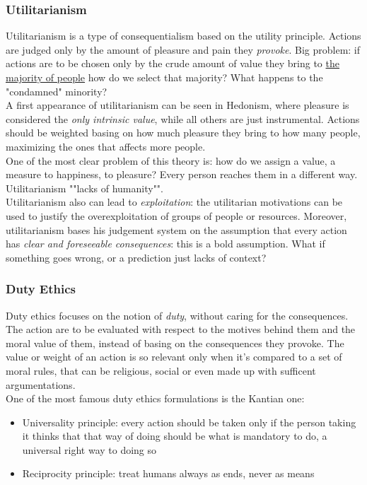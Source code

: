 \documentclass{article}
\begin{document}
			\subsubsection{Utilitarianism}
				Utilitarianism is a type of consequentialism based on the utility principle. Actions are judged only by the amount of pleasure and pain they \textit{provoke}. Big problem: if actions are to be chosen only by the crude amount of value they bring to \underline{the majority of people} how do we select that majority? What happens to the "condamned" minority?\\
				A first appearance of utilitarianism can be seen in Hedonism, where pleasure is considered the \textit{only intrinsic value}, while all others are just instrumental. Actions should be weighted basing on how much pleasure they bring to how many people, maximizing the ones that affects more people.\\
				One of the most clear problem of this theory is: how do we assign a value, a measure to happiness, to pleasure? Every person reaches them in a different way. Utilitarianism ""lacks of humanity"".\\
				Utilitarianism also can lead to \textit{exploitation}: the utilitarian motivations can be used to justify the overexploitation of groups of people or resources. Moreover, utilitarianism bases his judgement system on the assumption that every action has \textit{clear and foreseeable consequences}: this is a bold assumption. What if something goes wrong, or a prediction just lacks of context?

			\subsubsection{Duty Ethics}
				Duty ethics focuses on the notion of \textit{duty}, without caring for the consequences. The action are to be evaluated with respect to the motives behind them and the moral value of them, instead of basing on the consequences they provoke. The value or weight of an action is so relevant only when it's compared to a set of moral rules, that can be religious, social or even made up with sufficent argumentations.\\
				One of the most famous duty ethics formulations is the Kantian one:
				\begin{itemize}
					\item Universality principle: every action should be taken only if the person taking it thinks that that way of doing should be what is mandatory to do, a universal right way to doing so
					\item Reciprocity principle: treat humans always as ends, never as means
				\end{itemize}
\end{document}
